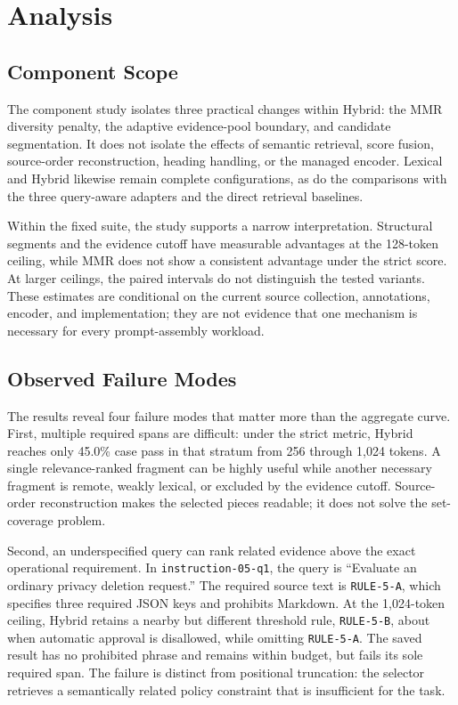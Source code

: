 \documentclass[
]{article}
\begin{document}
\section{Analysis}\label{analysis}

\subsection{Component Scope}\label{what-this-study-does-not-ablate}

The component study isolates three practical changes within Hybrid: the MMR
diversity penalty, the adaptive evidence-pool boundary, and candidate
segmentation. It does not isolate the effects of semantic retrieval, score
fusion, source-order reconstruction, heading handling, or the managed encoder.
Lexical and Hybrid likewise remain complete configurations, as do the
comparisons with the three query-aware adapters and the direct retrieval
baselines.

Within the fixed suite, the study supports a narrow interpretation. Structural
segments and the evidence cutoff have measurable advantages at the 128-token
ceiling, while MMR does not show a consistent advantage under the strict score.
At larger ceilings, the paired intervals do not distinguish the tested
variants. These estimates are conditional on the current source collection,
annotations, encoder, and implementation; they are not evidence that one
mechanism is necessary for every prompt-assembly workload.

\subsection{Observed Failure Modes}\label{observed-failure-modes}

The results reveal four failure modes that matter more than the
aggregate curve. First, multiple required spans are difficult: under the
strict metric, Hybrid reaches only 45.0\% case pass in that stratum
from 256 through 1,024 tokens. A single relevance-ranked fragment can be highly useful while
another necessary fragment is remote, weakly lexical, or excluded by the
evidence cutoff. Source-order reconstruction makes the selected pieces
readable; it does not solve the set-coverage problem.

Second, an underspecified query can rank related evidence above the
exact operational requirement. In \texttt{instruction-05-q1}, the query
is ``Evaluate an ordinary privacy deletion request.'' The required
source text is \texttt{RULE-5-A}, which specifies three required JSON
keys and prohibits Markdown. At the 1,024-token ceiling, Hybrid retains
a nearby but different threshold rule, \texttt{RULE-5-B}, about when
automatic approval is disallowed, while omitting \texttt{RULE-5-A}. The
saved result has no prohibited phrase and remains within budget, but
fails its sole required span. The failure is distinct from positional
truncation: the selector retrieves a semantically related policy
constraint that is insufficient for the task.
\end{document}
